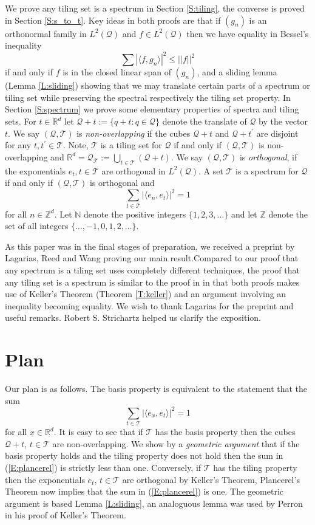 \documentclass[12pt]{amsart}
\theoremstyle{plain}
\numberwithin{equation}{section}
\newcommand{\Q}{\ensuremath{\mathcal{Q}}\xspace}
\newcommand{\T}{\ensuremath{\mathcal{T}}\xspace}
\newcommand{\Rd}{\ensuremath{\mathbb{R}^{d}}\xspace}
\newcommand{\N}{\ensuremath{\mathbb{N}}\xspace}
\newcommand{\Z}{\ensuremath{\mathbb{Z}}\xspace}
\newcommand{\Zd}{\ensuremath{\mathbb{Z}^{d}}\xspace}
\begin{document}
We prove any tiling set is a spectrum
in Section \ref{S:tiling}, the
converse is proved in Section \ref{S:s_to_t}.
Key ideas in both proofs are that if $(g_n)$ is an orthonormal
family in
$L^2(\Q)$ and $f\in L^2(\Q)$ then we have equality in Bessel's
inequality
\[
   \sum |\langle f,g_n \rangle |^2 \leq ||f||^2
\]
if and only if $f$ is in the closed linear span of $(g_n)$, and
a sliding lemma (Lemma \ref{L:sliding}) showing that we may
translate certain parts of a spectrum or tiling set while preserving
the spectral respectively the tiling set property.
In Section
\ref{S:spectrum} we prove some elementary properties of spectra and
tiling sets.
For $t\in\Rd$ let $\Q+t:=\{q+t:q\in\Q\}$ denote the translate of \Q
by the vector $t$.
We say $(\Q,\T)$ is \emph{non-overlapping} if the cubes $\Q+t$
and $\Q+t^{\prime}$ are disjoint for any $t,t^{\prime}\in\T$.
Note, \T is a tiling set for \Q if and only if $(\Q,\T)$ is
non-overlapping and $\Rd=\Q_{\T}:=\bigcup_{t\in\T}(\Q+t)$.
We say $(\Q,\T)$ is \emph{orthogonal}, if the exponentials
$e_t, t\in \T$ are orthogonal in $L^2(\Q)$. A set \T is a spectrum
for \Q if and only if $(\Q,\T)$ is orthogonal and
\[
   \sum_{t\in\T} |\langle e_n,e_t \rangle |^2 =1
\]
for all $n\in\Zd$.
Let
$\N$ denote the positive integers $\{1,2,3,\ldots\}$ and let
$\Z$ denote the set of all integers $\{\ldots,-1,0,1,2,\ldots\}$.

As this paper was in the final stages of preparation, we received a
preprint \cite{LRW} by Lagarias, Reed and Wang proving our main
result.Compared to \cite{LRW} our proof that any spectrum is a tiling
set uses completely different techniques, the proof that any tiling
set is a spectrum is similar to the proof in \cite{LRW} in that both
proofs makes use of Keller's Theorem (Theorem \ref{T:keller}) and an
argument involving an inequality becoming equality. We wish to thank
Lagarias for the preprint and useful remarks. Robert S. Strichartz
helped us clarify the exposition.

\section{Plan}\label{S:plan}
Our plan is as follows. The basis property is
equivalent to the statement that the sum
\begin{equation}\label{E:plancerel}
   \sum_{t\in\T} |\langle e_x,e_t \rangle |^2 =1
\end{equation}
for all $x\in\Rd$. It is easy to see that if \T has the basis
property then the cubes $\Q+t$, $t\in\T$ are non-overlapping.
We show by a \emph{geometric argument}
that if the basis
property holds and the tiling
property does not hold then the sum in (\ref{E:plancerel})
is strictly less than one.
Conversely, if \T has the tiling property then
the exponentials $e_t$, $t\in\T$
are orthogonal by Keller's Theorem, Plancerel's
Theorem now implies that the sum in (\ref{E:plancerel}) is one.
The geometric argument is based Lemma \ref{L:sliding}, an analoguous
lemma was used by Perron \cite{Per1} in his proof of Keller's Theorem.
\end{document}
